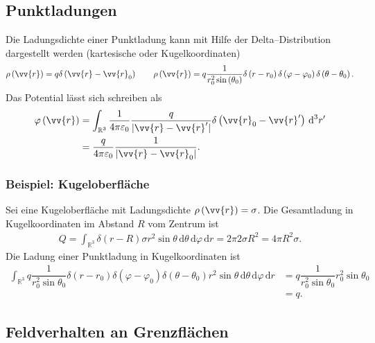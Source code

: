 \documentclass[a4paper,12pt]{article}
\newcommand{\td}{\,\text{d}}
\numberwithin{equation}{section}
\begin{document}
\subsection{Punktladungen}
Die Ladungsdichte einer Punktladung kann mit Hilfe der Delta--Distribution dargestellt werden (kartesische oder Kugelkoordinaten)
\begin{align} 
        \rho \left(\vv{r}\right)=q\delta \left(\vv{r}-\vv{r}_0\right)\qquad \rho \left(\vv{r}\right)=q\dfrac{1}{r_0^2\sin \left(\theta _0\right)}\delta \left(r-r_0\right)\delta \left(\varphi -\varphi _0\right)\delta \left(\theta -\theta _0\right)
.\end{align} 
Das Potential lässt sich schreiben als
\begin{align} 
        \varphi \left(\vv{r}\right)&=\int_{\mathbb{R}^3}^{}\dfrac{1}{4\pi \varepsilon _0}\dfrac{q}{|\vv{r}-\vv{r}'|}\delta \left(\vv{r}_0-\vv{r}'\right)\td ^3r'\\
                                   &=\dfrac{q}{4\pi \varepsilon _0}\dfrac{1}{|\vv{r}-\vv{r}_0|}
.\end{align} 

\subsubsection{Beispiel: Kugeloberfläche}
Sei eine Kugeloberfläche mit Ladungsdichte $\rho \left(\vv{r}\right)=\sigma$. Die Gesamtladung in Kugelkoordinaten im Abstand $R$ vom Zentrum ist
\begin{align} 
        Q=\int_{\mathbb{R}^3}^{}\delta \left(r-R\right)\sigma r^2\sin \theta \td \theta \td \varphi \td r=2\pi 2\sigma R^2=4\pi R^2\sigma 
.\end{align} 
Die Ladung einer Punktladung in Kugelkoordinaten ist
\begin{align} 
        \int_{\mathbb{R}^3}^{}q\dfrac{1}{r_0^2\sin \theta _0}\delta \left(r-r_0\right)\delta \left(\varphi -\varphi _0\right)\delta \left(\theta -\theta _0\right)r^2\sin \theta \td \theta \td \varphi \td r&=q\dfrac{1}{r_0^2\sin \theta _0}r_0^2\sin \theta _0\\
                                                                                    &=q
.\end{align} 

\subsection{Feldverhalten an Grenzflächen}
\end{document}
